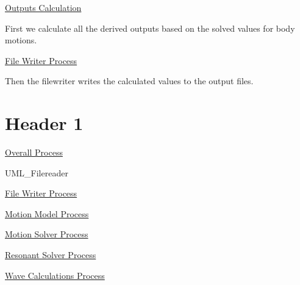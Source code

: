 \hyperlink{uml_outputscalculation}{Outputs Calculation}

First we calculate all the derived outputs based on the solved values for body motions.

\hyperlink{uml_writingfiles}{File Writer Process}

Then the filewriter writes the calculated values to the output files.

\section*{Header 1}

\hyperlink{UML_Overall}{Overall Process}

U\-M\-L\-\_\-\-Filereader

\hyperlink{UML_WritingFiles}{File Writer Process}

\hyperlink{UML_MotionModel}{Motion Model Process}

\hyperlink{UML_MotionSolver}{Motion Solver Process}

\hyperlink{UML_ResonantSolver}{Resonant Solver Process}

\hyperlink{UML_WaveCalculation}{Wave Calculations Process}

